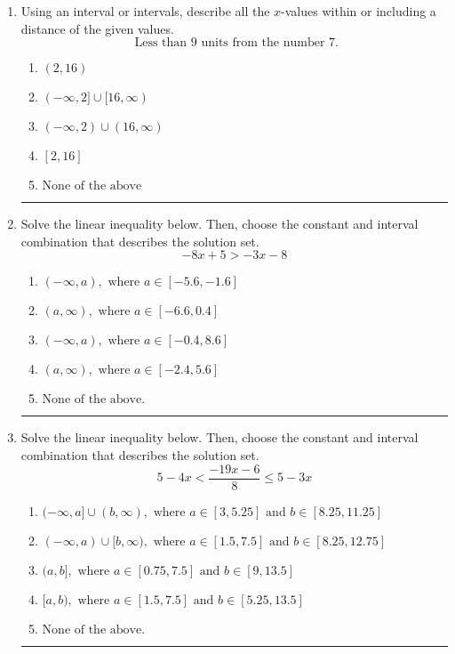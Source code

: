 \documentclass[14pt]{extbook}
\newcommand{\litem}[1]{\item#1\hspace*{-1cm}\rule{\textwidth}{0.4pt}}
\begin{document}
\begin{enumerate}
\litem{
Using an interval or intervals, describe all the $x$-values within or including a distance of the given values.\[ \text{ Less than } 9 \text{ units from the number } 7. \]\begin{enumerate}[label=\Alph*.]
\item \( (2, 16) \)
\item \( (-\infty, 2] \cup [16, \infty) \)
\item \( (-\infty, 2) \cup (16, \infty) \)
\item \( [2, 16] \)
\item \( \text{None of the above} \)

\end{enumerate} }
\litem{
Solve the linear inequality below. Then, choose the constant and interval combination that describes the solution set.\[ -8x + 5 > -3x -8 \]\begin{enumerate}[label=\Alph*.]
\item \( (-\infty, a), \text{ where } a \in [-5.6, -1.6] \)
\item \( (a, \infty), \text{ where } a \in [-6.6, 0.4] \)
\item \( (-\infty, a), \text{ where } a \in [-0.4, 8.6] \)
\item \( (a, \infty), \text{ where } a \in [-2.4, 5.6] \)
\item \( \text{None of the above}. \)

\end{enumerate} }
\litem{
Solve the linear inequality below. Then, choose the constant and interval combination that describes the solution set.\[ 5 - 4 x < \frac{-19 x - 6}{8} \leq 5 - 3 x \]\begin{enumerate}[label=\Alph*.]
\item \( (-\infty, a] \cup (b, \infty), \text{ where } a \in [3, 5.25] \text{ and } b \in [8.25, 11.25] \)
\item \( (-\infty, a) \cup [b, \infty), \text{ where } a \in [1.5, 7.5] \text{ and } b \in [8.25, 12.75] \)
\item \( (a, b], \text{ where } a \in [0.75, 7.5] \text{ and } b \in [9, 13.5] \)
\item \( [a, b), \text{ where } a \in [1.5, 7.5] \text{ and } b \in [5.25, 13.5] \)
\item \( \text{None of the above.} \)


\end{enumerate}}
\end{enumerate}
\end{document}
